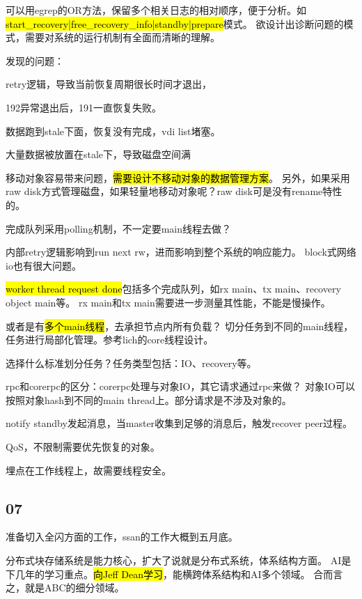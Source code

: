 可以用egrep的OR方法，保留多个相关日志的相对顺序，便于分析。如\hl{start\_recovery|free\_recovery\_info|standby|prepare}模式。
欲设计出诊断问题的模式，需要对系统的运行机制有全面而清晰的理解。

发现的问题：
\begin{enumbox}
\item retry逻辑，导致当前恢复周期很长时间才退出，
\item 192异常退出后，191一直恢复失败。
\item 数据跑到stale下面，恢复没有完成，vdi list堵塞。
\item 大量数据被放置在stale下，导致磁盘空间满
\end{enumbox}

移动对象容易带来问题，\hl{需要设计不移动对象的数据管理方案}。
另外，如果采用raw disk方式管理磁盘，如果轻量地移动对象呢？raw disk可是没有rename特性的。

完成队列采用polling机制，不一定要main线程去做？

内部retry逻辑影响到run next rw，进而影响到整个系统的响应能力。
block式网络io也有很大问题。

\hrulefill

\hl{worker thread request done}包括多个完成队列，如rx main、tx main、recovery object main等。
rx main和tx main需要进一步测量其性能，不能是慢操作。

或者是有\hl{多个main线程}，去承担节点内所有负载？
切分任务到不同的main线程，任务进行局部化管理。参考lich的core线程设计。

选择什么标准划分任务？任务类型包括：IO、recovery等。

rpc和corerpc的区分：corerpc处理与对象IO，其它请求通过rpc来做？
对象IO可以按照对象hash到不同的main thread上。部分请求是不涉及对象的。

\hrulefill

notify standby发起消息，当master收集到足够的消息后，触发recover peer过程。

\hrulefill

QoS，不限制需要优先恢复的对象。

埋点在工作线程上，故需要线程安全。

\subsection{07}

准备切入全闪方面的工作，ssan的工作大概到五月底。

分布式块存储系统是能力核心，扩大了说就是分布式系统，体系结构方面。
AI是下几年的学习重点。\hl{向Jeff Dean学习}，能横跨体系结构和AI多个领域。
合而言之，就是ABC的细分领域。

